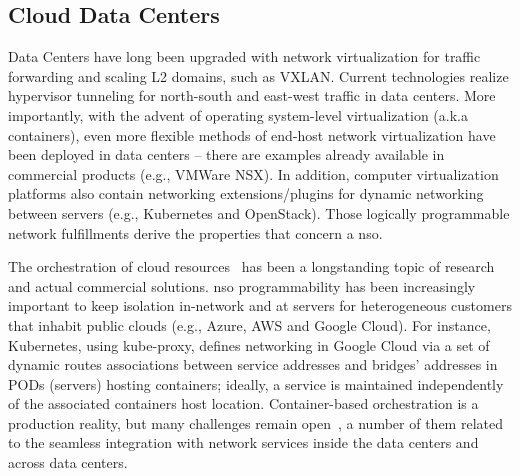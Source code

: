 \subsection{Cloud Data Centers}

Data Centers have long been upgraded with network virtualization for traffic forwarding and scaling L2 domains, such as VXLAN. Current technologies realize hypervisor tunneling for north-south and east-west traffic in data centers. More importantly, with the advent of operating system-level virtualization (a.k.a containers), even more flexible methods of end-host network virtualization have been deployed in data centers -- there are examples already available in commercial products (e.g., VMWare NSX). In addition, computer virtualization platforms also contain networking extensions/plugins for dynamic networking between servers (e.g., Kubernetes and OpenStack). Those logically programmable network fulfillments derive the properties that concern a \gls{nso}.


The orchestration of cloud resources~\cite{liu2011cloud} has been a longstanding topic of research and actual commercial solutions.  \gls{nso} programmability has been increasingly important to keep isolation in-network and at servers for heterogeneous customers that inhabit public clouds (e.g., Azure, AWS and Google Cloud). For instance, Kubernetes, using kube-proxy, defines networking in Google Cloud via a set of dynamic routes associations between service addresses and bridges' addresses in PODs (servers) hosting containers; ideally, a service is maintained independently of the associated containers host location. Container-based orchestration is a production reality, but many challenges remain open~\cite{7185168}, a number of them related to the seamless integration with network services inside the data centers and across data centers.

